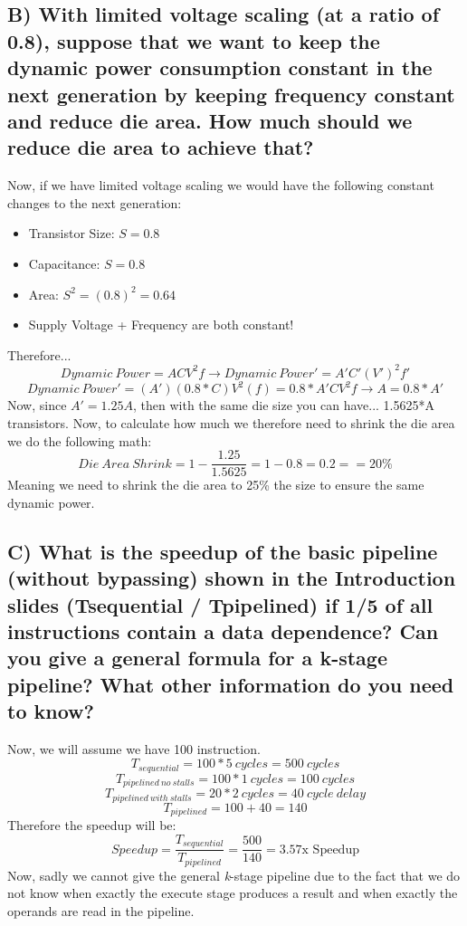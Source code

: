 \documentclass{article}
\begin{document}
\subsection{B) With limited voltage scaling (at a ratio of 0.8), suppose that we want to keep the dynamic power consumption constant in the next generation by keeping frequency constant and reduce die area. How much should we reduce die area to achieve that?}
Now, if we have limited voltage scaling we would have the following constant changes to the next generation:
\begin{itemize}
  \item Transistor Size: $S = 0.8$
  \item Capacitance: $S = 0.8$
  \item Area: $S^2 = (0.8)^2 = 0.64$
  \item Supply Voltage + Frequency are both constant!
\end{itemize}
Therefore...
$$ Dynamic\ Power = ACV^2f \rightarrow Dynamic\ Power' = A'C'(V')^2f' $$
$$ Dynamic\ Power' = (A')(0.8*C)V^2(f) = 0.8*A'CV^2f \rightarrow A = 0.8*A'$$
Now, since $A' = 1.25A$, then with the same die size you can have... 1.5625*A transistors. Now, to calculate how much we therefore need to shrink the die area we do the following math:
$$ Die\ Area\ Shrink = 1 - \frac{1.25}{1.5625} = 1 - 0.8 = 0.2 == 20\% $$
Meaning we need to shrink the die area to 25\% the size to ensure the same dynamic power.

\pagebreak
\subsection{C) What is the speedup of the basic pipeline (without bypassing) shown in the Introduction slides (Tsequential / Tpipelined) if 1/5 of all instructions contain a data dependence? Can you give a general formula for a k-stage pipeline? What other information do you need to know?}
Now, we will assume we have 100 instruction.
$$ T_{sequential} = 100 * 5\ cycles = 500\ cycles $$
$$ T_{pipelined\ no\ stalls} = 100 * 1\ cycles = 100\ cycles $$
$$ T_{pipelined\ with\ stalls} = 20 * 2\ cycles = 40\ cycle\ delay $$
$$ T_{pipelined} = 100 + 40 = 140 $$
Therefore the speedup will be:
$$ Speedup = \frac{T_{sequential}}{T_{pipelined}} = \frac{500}{140} = 3.57\text{x Speedup} $$
Now, sadly we cannot give the general \textit{k}-stage pipeline due to the fact that we do not know when exactly the execute stage produces a result and when exactly the operands are read in the pipeline.
\end{document}
